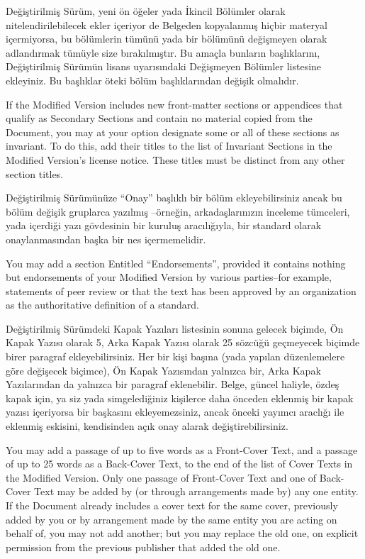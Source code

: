 \begin{multicols}{2}
Değiştirilmiş Sürüm, yeni ön öğeler yada İkincil Bölümler olarak nitelendirilebilecek ekler içeriyor de Belgeden kopyalanmış hiçbir materyal içermiyorsa, bu bölümlerin tümünü yada bir bölümünü değişmeyen olarak adlandırmak tümüyle size bırakılmıştır. Bu amaçla bunların başlıklarını, Değiştirilmiş Sürümün lisans uyarısındaki Değişmeyen Bölümler listesine ekleyiniz. Bu başlıklar öteki bölüm başlıklarından değişik olmalıdır.

\begin{ingliz}If the Modified Version includes new front-matter sections
or appendices that qualify as Secondary Sections and contain
no material copied from the Document, you may at your option
designate some or all of these sections as invariant.  To do
this, add their titles to the list of Invariant Sections in
the Modified Version's license notice. These titles must
be distinct from any other section titles.\end{ingliz}

Değiştirilmiş Sürümünüze “Onay” başlıklı bir bölüm ekleyebilirsiniz ancak bu bölüm değişik gruplarca yazılmış --örneğin, arkadaşlarınızın inceleme tümceleri, yada içerdiği yazı gövdesinin bir kuruluş aracılığıyla, bir standard olarak onaylanmasından başka bir nes içermemelidir.

\begin{ingliz}You may add a section Entitled
``Endorsements'', provided it contains nothing but
endorsements of your Modified Version by various parties--for
example, statements of peer review or that the text has been
approved by an organization as the authoritative definition of
a standard.\end{ingliz}

Değiştirilmiş Sürümdeki Kapak Yazıları listesinin sonuna gelecek biçimde, Ön Kapak Yazısı olarak 5, Arka Kapak Yazısı olarak  25 sözcüğü geçmeyecek biçimde birer paragraf ekleyebilirsiniz. Her bir kişi başına (yada yapılan düzenlemelere göre değişecek biçimce), Ön Kapak Yazısından yalnızca bir, Arka Kapak Yazılarından da yalnızca bir paragraf eklenebilir. Belge, güncel haliyle, özdeş kapak için, ya siz yada simgelediğiniz kişilerce daha önceden eklenmiş bir kapak yazısı içeriyorsa bir başkasını ekleyemezsiniz, ancak önceki yayımcı araclığı ile eklenmiş eskisini, kendisinden açık onay alarak değiştirebilirsiniz.

\begin{ingliz}You may add a passage of up to five words as a Front-Cover
Text, and a passage of up to 25 words as a Back-Cover Text, to
the end of the list of Cover Texts in the Modified Version.
Only one passage of Front-Cover Text and one of Back-Cover
Text may be added by (or through arrangements made by) any one
entity.  If the Document already includes a cover text for the
same cover, previously added by you or by arrangement made by
the same entity you are acting on behalf of, you may not add
another; but you may replace the old one, on explicit
permission from the previous publisher that added the old one.\end{ingliz}


\end{multicols}
